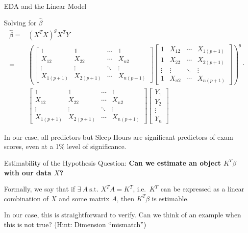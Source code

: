 \documentclass[
  ignorenonframetext,
]{beamer}
\begin{document}
\begin{frame}[fragile]{EDA and the Linear Model}
\begin{block}{Solving for \(\hat{\beta}\)}
\[
\begin{aligned}
\hat{\beta} = &(X^TX)^{g}X^TY \\
= &\left( 
\begin{bmatrix} 1 & 1 & \cdots & 1 \\ X_{12} & X_{22} & \cdots & X_{n2} \\ \vdots & \vdots & \ddots & \vdots \\ X_{1(p+1)} & X_{2(p+1)} & \cdots & X_{n(p+1)} \end{bmatrix} 
\begin{bmatrix} 1 & X_{12} & \cdots & X_{1(p+1)} \\ 1 & X_{22} & \cdots & X_{2(p+1)} \\ \vdots & \vdots & \ddots & \vdots \\ 1 & X_{n2} & \cdots & X_{n(p+1)} \end{bmatrix} 
\right)^{g} 
\cdot \\
&\begin{bmatrix} 1 & 1 & \cdots & 1 \\ X_{12} & X_{22} & \cdots & X_{n2} \\ \vdots & \vdots & \ddots & \vdots \\ X_{1(p+1)} & X_{2(p+1)} & \cdots & X_{n(p+1)} \end{bmatrix} 
\begin{bmatrix} Y_1 \\ Y_2 \\ \vdots \\ Y_n \end{bmatrix}
\end{aligned}
\]

In our case, all predictors but Sleep Hours are significant predictors
of exam scores, even at a 1\% level of significance.
\end{block}

\begin{block}{Estimability of the Hypothesis}
\label{estimability-of-the-hypothesis}
Question: \textbf{Can we estimate an object \(K^T \beta\) with our data
\(X\)?}

Formally, we say that if \(\exists ~ A ~ \text{s.t. } X^TA = K^T\),
i.e.~\(K^T\) can be expressed as a linear combination of \(X\) and some
matrix \(A\), then \(K^T \beta\) is estimable.

In our case, this is straightforward to verify. Can we think of an
example when this is not true? (Hint: Dimension ``mismatch'')
\end{block}


\end{frame}
\end{document}
